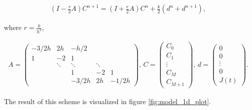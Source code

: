 \begin{align*}
\left(I - \frac{r}{2} A\right)C^{n+1} = \left(I + \frac{r}{2} A\right) C^n + \frac{k}{2}(d^n + d^{n+1}),
\end{align*}

where $r = \frac{k}{h^2}$,


\begin{align*}
A = 
\begin{pmatrix}
  -3/2h & 2h & -h/2 &  \\
  1 & -2 & 1 &  \\
  &  \ddots & \ddots & \ddots  \\
  &  & 1 & -2 & 1 \\
  &  & -3/2h & 2h & -1/2h 
\end{pmatrix} 
\textrm{, }
C = \begin{pmatrix}
C_0 \\
C_1 \\
\vdots \\
C_{M} \\
C_{M+1} 
\end{pmatrix}
\textrm{, }
d =
\begin{pmatrix}
0 \\
0 \\
\vdots \\
0 \\
J(t)
\end{pmatrix}.
\end{align*}

The result of this scheme is visualized in figure \ref{fig:model_1d_plot}. 


